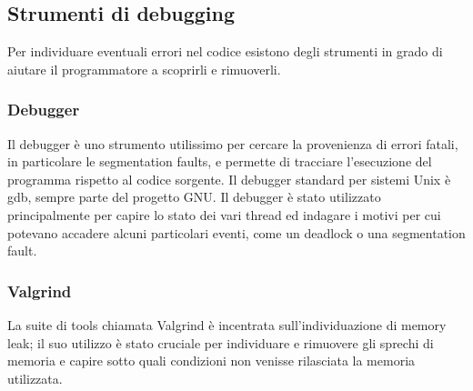\subsection{Strumenti di debugging}
Per individuare eventuali errori nel codice esistono degli strumenti in grado di
aiutare il programmatore a scoprirli e rimuoverli.

\subsubsection{Debugger}
Il debugger \`e uno strumento utilissimo per cercare la provenienza di errori
fatali, in particolare le segmentation faults, e permette di tracciare
l'esecuzione del programma rispetto al codice sorgente. Il debugger standard per
sistemi Unix \`e gdb, sempre parte del progetto GNU. Il debugger \`e stato
utilizzato principalmente per capire lo stato dei vari thread ed indagare i
motivi per cui potevano accadere alcuni particolari eventi, come un deadlock o
una segmentation fault.

\subsubsection{Valgrind}
La suite di tools chiamata Valgrind \`e incentrata sull'individuazione di
memory leak; il suo utilizzo \`e stato cruciale per individuare e rimuovere gli
sprechi di memoria e capire sotto quali condizioni non venisse rilasciata la
memoria utilizzata.
